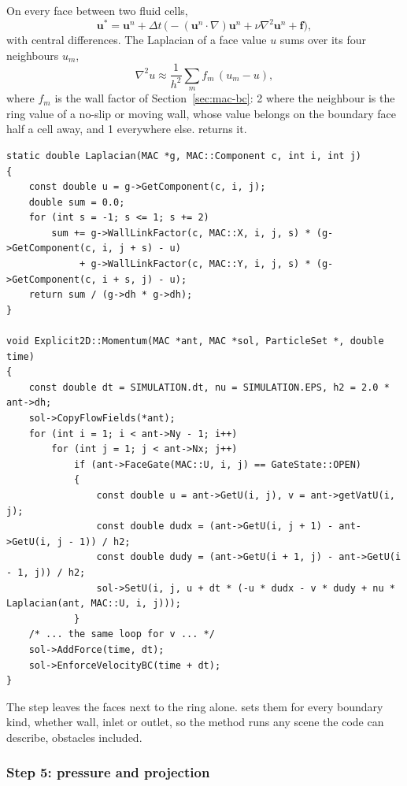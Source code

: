 \documentclass[10pt,a4paper]{article}
\newcommand{\code}[1]{\texttt{\detokenize{#1}}}
\begin{document}
On every face between two fluid cells,
\begin{equation*}
  \mathbf u^* = \mathbf u^n + \Delta t\,\bigl(-(\mathbf u^n\cdot\nabla)\mathbf u^n + \nu\nabla^2\mathbf u^n
   + \mathbf f\bigr),
\end{equation*}
with central differences. The Laplacian of a face value $u$ sums over its four neighbours $u_m$,
\begin{equation*}
  \nabla^2 u \approx \frac{1}{h^2}\sum_{m} f_m\,(u_m - u),
\end{equation*}
where $f_m$ is the wall factor of Section~\ref{sec:mac-bc}: 2 where the neighbour is the ring value of a no-slip or
moving wall, whose value belongs on the boundary face half a cell away, and 1 everywhere else.
\code{MAC::WallLinkFactor} returns it.
\begin{lstlisting}[style=ex]
static double Laplacian(MAC *g, MAC::Component c, int i, int j)
{
    const double u = g->GetComponent(c, i, j);
    double sum = 0.0;
    for (int s = -1; s <= 1; s += 2)
        sum += g->WallLinkFactor(c, MAC::X, i, j, s) * (g->GetComponent(c, i, j + s) - u)
             + g->WallLinkFactor(c, MAC::Y, i, j, s) * (g->GetComponent(c, i + s, j) - u);
    return sum / (g->dh * g->dh);
}

void Explicit2D::Momentum(MAC *ant, MAC *sol, ParticleSet *, double time)
{
    const double dt = SIMULATION.dt, nu = SIMULATION.EPS, h2 = 2.0 * ant->dh;
    sol->CopyFlowFields(*ant);
    for (int i = 1; i < ant->Ny - 1; i++)
        for (int j = 1; j < ant->Nx; j++)
            if (ant->FaceGate(MAC::U, i, j) == GateState::OPEN)
            {
                const double u = ant->GetU(i, j), v = ant->getVatU(i, j);
                const double dudx = (ant->GetU(i, j + 1) - ant->GetU(i, j - 1)) / h2;
                const double dudy = (ant->GetU(i + 1, j) - ant->GetU(i - 1, j)) / h2;
                sol->SetU(i, j, u + dt * (-u * dudx - v * dudy + nu * Laplacian(ant, MAC::U, i, j)));
            }
    /* ... the same loop for v ... */
    sol->AddForce(time, dt);
    sol->EnforceVelocityBC(time + dt);
}
\end{lstlisting}
The step leaves the faces next to the ring alone. \code{EnforceVelocityBC} sets them for every boundary kind, whether
wall, inlet or outlet, so the method runs any scene the code can describe, obstacles included.

\subsubsection*{Step 5: pressure and projection}
\end{document}
